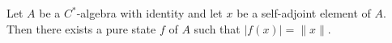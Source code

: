 Let $A$ be a $C^*$-algebra with identity and let $x$ be a self-adjoint element of $A$. Then there exists a pure state $f$ of $A$ such that $|f(x)| = \|x\|$.
